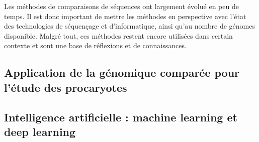 Les méthodes de comparaisons de séquences ont largement évolué en peu de temps. Il est donc important de mettre les méthodes en perspective avec l'état des technologies de séquençage et d'informatique, ainsi qu'au nombre de génomes disponible. Malgré tout, ces méthodes restent encore utilisées dans certain contexte et sont une base de réflexions et de connaissances. 







\subsection{Application de la génomique comparée pour l'étude des procaryotes}

\subsection{Intelligence artificielle : machine learning et deep learning}

